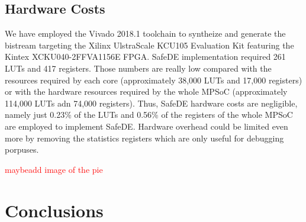 
\subsection{Hardware Costs}

We have employed the Vivado 2018.1 toolchain to syntheize and generate the bistream targeting the Xilinx UlstraScale KCU105 Evaluation Kit featuring the Kintex XCKU040-2FFVA1156E FPGA. SafeDE implementation required 261 LUTs and 417 registers. Those numbers are really low compared with the resources required by each core (approximately 38,000 LUTs and 17,000 registers) or with the hardware resources required by the whole MPSoC (approximately 114,000 LUTs adn 74,000 registers). Thus, SafeDE hardware costs are negligible, namely just 0.23\% of the LUTs and 0.56\% of the registers of the whole MPSoC are employed to implement SafeDE. Hardware overhead could be limited even more by removing the statistics registers which are only useful for debugging porpuses.

\textcolor{red}{maybeadd image of the pie }


\section{Conclusions}
